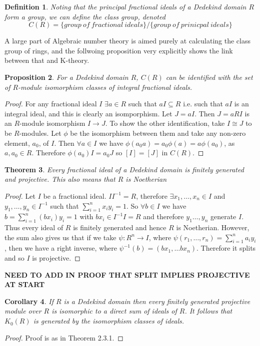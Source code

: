 \documentclass[a4paper,10pt]{article}
\newtheorem{thm}{Theorem}[subsection]
\newtheorem{prop}[thm]{Proposition}
\newtheorem{defn}[thm]{Definition}
\newtheorem{cor}[thm]{Corollary}
\begin{document}
\begin{defn}
Noting that the principal fractional ideals of a Dedekind domain $R$ form a group, we can define the class group, denoted $$C(R)= \{group\ of\ fractional\ ideals\}/\{group\ of\ prinicpal\ ideals\}$$
\end{defn}

A large part of Algebraic number theory is aimed purely at calculating the class group of rings, and the follwoing proposition very explicitly shows the link between that and K-theory.

\begin{prop}
For a Dedekind domain $R$, $C(R)$ can be identified with the set of $R$-module isomorphism classes of integral fractional ideals.
\end{prop}
\begin{proof}
For any fractional ideal $I$ $\exists a\in R$ such that $aI\subseteq R$ i.e. such that $aI$ is an integral ideal, and this is clearly an isomporphism. Let $J=aI$. Then $J=aRI$ is an $R$-module isomorphism $I\rightarrow J$. 
To show the other identification, take $I\cong J$ to be $R$-modules. Let $\phi$ be the isomorphism between them and take any non-zero element, $a_{0}$, of $I$. Then $\forall a\in I$ we have $\phi(a_{0}a)=a_{0}\phi(a)=a\phi(a_{0})$, as $a,a_{0}\in R$. Therefore $\phi(a_{0})I=a_{0}J$ so $[I]=[J]$ in $C(R)$.
\end{proof}

\begin{thm}
Every fractional ideal of a Dedekind domain is finitely generated and projective. This also means that $R$ is Noetherian
\end{thm}
\begin{proof}
Let $I$ be a fractional ideal. $II^{-1}=R$, therefore $\exists x_{1},\ldots ,x_{n}\in I$ and $y_{1},\ldots ,y_{n}\in I^{-1}$ such that $\sum_{i=1}^{n}x_{i}y_{i}=1$. So $\forall b\in I$ we have $b=\sum_{i=1}^{n}(bx_{i})y_{i}=1$ with $bx_{i}\in I^{-1}I=R$ and therefore $y_{1}\ldots ,y_{n}$ generate $I$. Thus every ideal of $R$ is finitely generated and hence $R$ is Noetherian. However, the sum also gives us that if we take $\psi :R^{n}\rightarrow I$, where $\psi(r_{1},\ldots ,r_{n})=\sum_{i=1}^{n}a_{i}y_{i}$, then we have a right inverse, where $\psi ^{-1}(b)=(bx_{1},\ldots bx_{n})$. Therefore it splits and so $I$ is projective.
\end{proof}
\textbf{NEED TO ADD IN PROOF THAT SPLIT IMPLIES PROJECTIVE AT START}

\begin{cor}
If $R$ is a Dedekind domain then every finitely generated projective module over $R$ is isomorphic to a direct sum of ideals of $R$. It follows that $K_{0}(R)$ is generated by the isomorphism classes of ideals.
\end{cor}
\begin{proof}
Proof is as in Theorem 2.3.1.
\end{proof}
\end{document}
